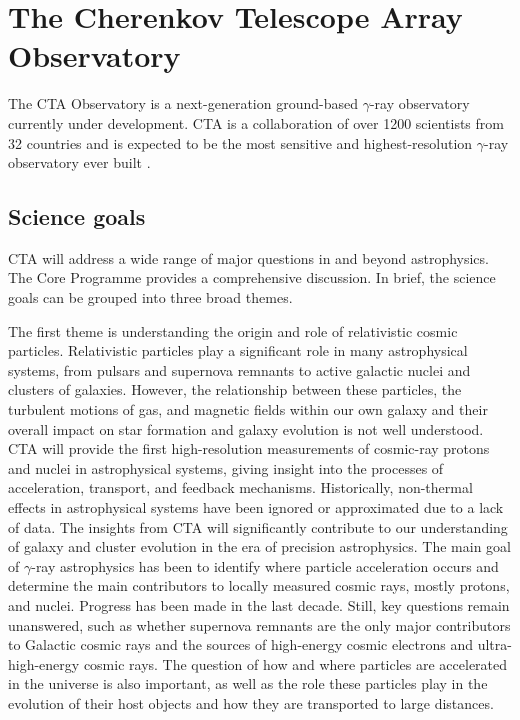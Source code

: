 \section{The Cherenkov Telescope Array Observatory}
\label{s:CTA}
The CTA Observatory is a next-generation ground-based $\gamma$-ray observatory currently under development. CTA is a collaboration of over 1200 scientists from 32 countries and is expected to be the most sensitive and highest-resolution $\gamma$-ray observatory ever built \cite{ScienceWithCherenkovTelescopeArray2018}.

\subsection{Science goals}
\label{s:science-goals}
CTA will address a wide range of major questions in and beyond astrophysics. The Core Programme \cite{ScienceWithCherenkovTelescopeArray2018} provides a comprehensive discussion. In brief, the science goals can be grouped into three broad themes. 

The first theme is understanding the origin and role of relativistic cosmic particles. Relativistic particles play a significant role in many astrophysical systems, from pulsars and supernova remnants to active galactic nuclei and clusters of galaxies. However, the relationship between these particles, the turbulent motions of gas, and magnetic fields within our own galaxy and their overall impact on star formation and galaxy evolution is not well understood. CTA will provide the first high-resolution measurements of cosmic-ray protons and nuclei in astrophysical systems, giving insight into the processes of acceleration, transport, and feedback mechanisms. Historically, non-thermal effects in astrophysical systems have been ignored or approximated due to a lack of data. The insights from CTA will significantly contribute to our understanding of galaxy and cluster evolution in the era of precision astrophysics. The main goal of $\gamma$-ray astrophysics has been to identify where particle acceleration occurs and determine the main contributors to locally measured cosmic rays, mostly protons, and nuclei. Progress has been made in the last decade. Still, key questions remain unanswered, such as whether supernova remnants are the only major contributors to Galactic cosmic rays and the sources of high-energy cosmic electrons and ultra-high-energy cosmic rays. The question of how and where particles are accelerated in the universe is also important, as well as the role these particles play in the evolution of their host objects and how they are transported to large distances.

